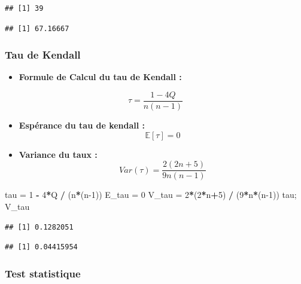 \documentclass[
  12pt,
]{article}
\newenvironment{Shaded}{\begin{snugshade}}{\end{snugshade}}
\newcommand{\DecValTok}[1]{\textcolor[rgb]{0.00,0.00,0.81}{#1}}
\newcommand{\NormalTok}[1]{#1}
\newcommand{\OtherTok}[1]{\textcolor[rgb]{0.56,0.35,0.01}{#1}}
\newcommand{\SpecialCharTok}[1]{\textcolor[rgb]{0.81,0.36,0.00}{\textbf{#1}}}
\providecommand{\tightlist}{%
  \setlength{\itemsep}{0pt}\setlength{\parskip}{0pt}}
\begin{document}
\begin{verbatim}
## [1] 39
\end{verbatim}

\begin{verbatim}
## [1] 67.16667
\end{verbatim}

\subsubsection{Tau de Kendall}\label{tau-de-kendall}

\begin{itemize}
\tightlist
\item
  \textbf{Formule de Calcul du tau de Kendall : }
\end{itemize}

\[\tau = \dfrac{1 - 4Q}{n(n - 1)}\]

\begin{itemize}
\item
  \textbf{Espérance du tau de kendall :} \[\mathbb {E} [\tau] = 0\]
\item
  \textbf{Variance du taux :} \[Var(\tau)= \dfrac{2(2n+5)}{9n(n−1)}\]
\end{itemize}

\begin{Shaded}
\begin{Highlighting}[]
\NormalTok{tau }\OtherTok{=} \DecValTok{1} \SpecialCharTok{{-}} \DecValTok{4}\SpecialCharTok{*}\NormalTok{Q }\SpecialCharTok{/}\NormalTok{ (n}\SpecialCharTok{*}\NormalTok{(n}\DecValTok{{-}1}\NormalTok{))}
\NormalTok{E\_tau }\OtherTok{=} \DecValTok{0}
\NormalTok{V\_tau }\OtherTok{=} \DecValTok{2}\SpecialCharTok{*}\NormalTok{(}\DecValTok{2}\SpecialCharTok{*}\NormalTok{n}\SpecialCharTok{+}\DecValTok{5}\NormalTok{) }\SpecialCharTok{/}\NormalTok{ (}\DecValTok{9}\SpecialCharTok{*}\NormalTok{n}\SpecialCharTok{*}\NormalTok{(n}\DecValTok{{-}1}\NormalTok{))}
\NormalTok{tau; V\_tau}
\end{Highlighting}
\end{Shaded}

\begin{verbatim}
## [1] 0.1282051
\end{verbatim}

\begin{verbatim}
## [1] 0.04415954
\end{verbatim}

\subsubsection{Test statistique}\label{test-statistique}
\end{document}
